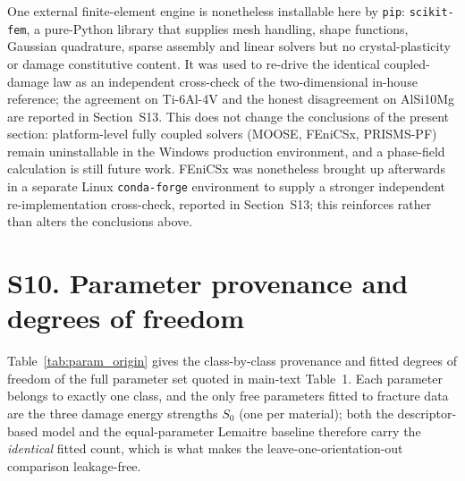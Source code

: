 \documentclass[11pt,a4paper,twocolumn]{article}
\begin{document}
One external finite-element engine is nonetheless installable here by \texttt{pip}: \texttt{scikit-fem}, a
pure-Python library that supplies mesh handling, shape functions, Gaussian quadrature, sparse assembly and
linear solvers but no crystal-plasticity or damage constitutive content. It was used to re-drive the
identical coupled-damage law as an independent cross-check of the two-dimensional in-house reference; the
agreement on Ti-6Al-4V and the honest disagreement on AlSi10Mg are reported in Section~S13. This does not
change the conclusions of the present section: platform-level fully coupled solvers (MOOSE, FEniCSx,
PRISMS-PF) remain uninstallable in the Windows production environment, and a phase-field calculation is still
future work. FEniCSx was nonetheless brought up afterwards in a separate Linux \texttt{conda-forge}
environment to supply a stronger independent re-implementation cross-check, reported in Section~S13; this
reinforces rather than alters the conclusions above.

\section*{S10. Parameter provenance and degrees of freedom}

Table~\ref{tab:param_origin} gives the class-by-class provenance and fitted degrees of freedom of the
full parameter set quoted in main-text Table~1. Each parameter belongs to exactly one class, and the
only free parameters fitted to fracture data are the three damage energy strengths $S_0$ (one per
material); both the descriptor-based model and the equal-parameter Lemaitre baseline therefore carry the
\emph{identical} fitted count, which is what makes the leave-one-orientation-out comparison leakage-free.
\end{document}
